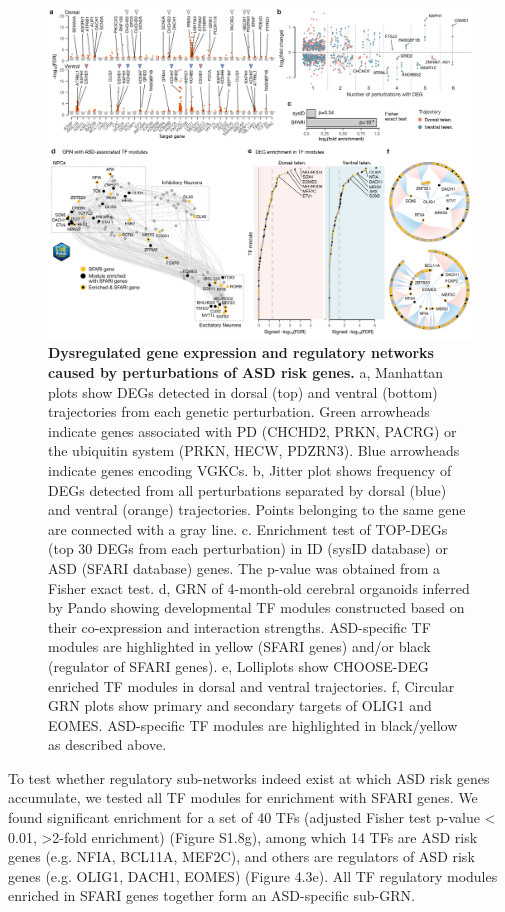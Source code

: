 \begin{figure}[t!]
    \centering
	\includegraphics[width=\textwidth]{figures/asd/Figure_3}
    \caption{\textbf{Dysregulated gene expression and regulatory networks caused by perturbations of ASD risk genes.}
    a, Manhattan plots show DEGs detected in dorsal (top) and ventral (bottom) trajectories from each genetic perturbation. Green arrowheads indicate genes associated with PD (CHCHD2, PRKN, PACRG) or the ubiquitin system (PRKN, HECW, PDZRN3). Blue arrowheads indicate genes encoding VGKCs. b, Jitter plot shows frequency of DEGs detected from all perturbations separated by dorsal (blue) and ventral (orange) trajectories. Points belonging to the same gene are connected with a gray line. c. Enrichment test of TOP-DEGs (top 30 DEGs from each perturbation) in ID (sysID database) or ASD (SFARI database) genes. The p-value was obtained from a Fisher exact test. d, GRN of 4-month-old cerebral organoids inferred by Pando showing developmental TF modules constructed based on their co-expression and interaction strengths. ASD-specific TF modules are highlighted in yellow (SFARI genes) and/or black (regulator of SFARI genes). e, Lolliplots show CHOOSE-DEG enriched TF modules in dorsal and ventral trajectories. f, Circular GRN plots show primary and secondary targets of OLIG1 and EOMES. ASD-specific TF modules are highlighted in black/yellow as described above.}
    \label{fig:asd3}
\end{figure}

To test whether regulatory sub-networks indeed exist at which ASD risk genes accumulate, we tested all TF modules for enrichment with SFARI genes. We found significant enrichment for a set of 40 TFs (adjusted Fisher test p-value < 0.01, >2-fold enrichment) (Figure S1.8g), among which 14 TFs are ASD risk genes (e.g. NFIA, BCL11A, MEF2C), and others are regulators of ASD risk genes (e.g. OLIG1, DACH1, EOMES) (Figure 4.3e). All TF regulatory modules enriched in SFARI genes together form an ASD-specific sub-GRN.

